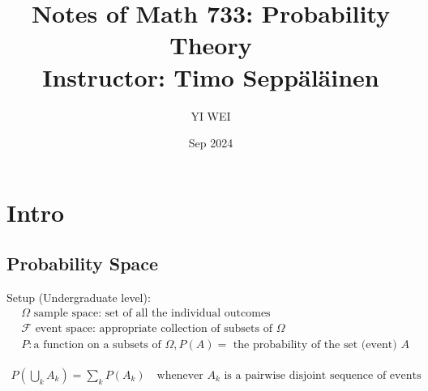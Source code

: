 \documentclass[11pt]{article}
\title{Notes of Math 733: Probability Theory\\ Instructor: Timo Seppäläinen}
\author{YI WEI}
\date{Sep 2024}
\begin{document}
\maketitle
\tableofcontents



\section{Intro}

\subsection{Probability Space}

Setup (Undergraduate level):
\begin{align*}
    &\Omega \text{ sample space: set of all the individual outcomes} \\
    &\mathcal{F}\text{ event space: appropriate collection of subsets of } \Omega\\
    &P: \text{a function on a subsets of } \Omega, P(A)= \text{ the probability of the set (event) }A 
\end{align*}

\begin{axiom}
    \begin{align*}
        P(\bigcup_k A_k) = \sum_{k} P(A_k) \quad \text{whenever } {A_k} \text{ is a pairwise disjoint sequence of events} 
    \end{align*}
\end{axiom}
\end{document}
